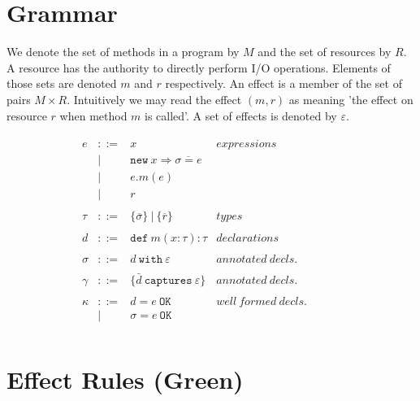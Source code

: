 \documentclass{article}
\newcommand{\keywadj}[1]{\mathtt{#1}}
\newcommand{\keyw}[1]{\keywadj{#1}~}
\begin{document}
\section{Grammar}

We denote the set of methods in a program by $M$ and the set of resources by $R$. A resource has the authority to directly perform I/O operations. Elements of those sets are denoted $m$ and $r$ respectively. An effect is a member of the set of pairs $M \times R$. Intuitively we may read the effect $(m,r)$ as meaning 'the effect on resource $r$ when method $m$ is called'. A set of effects is denoted by $\varepsilon$.

\[
\begin{array}{lll}

\begin{array}{lllr}
e & ::= & x & expressions \\
  & | & \keywadj{new}~x \Rightarrow \overline{\sigma = e} \\
  & | & e.m(e)\\
  & | & r \\
&&\\

\tau & ::= & \{ \overline{\sigma} \} ~ | ~ \{ \overline r \} & types \\

\\d & ::= & \keyw{def} m(x:\tau):\tau & declarations\\
&&\\

\sigma & ::= & d~\keyw{with}\varepsilon  & annotated~ decls.\\
&&\\

\gamma & ::= & \{ \bar d~\keyw{captures} \varepsilon \} & annotated~decls.\\
&&\\

\kappa & ::= & d = e~\keyw{OK} & well~formed~decls. \\
  & | & \sigma = e~\keyw{OK}\\
\end{array}
& ~~~~~~
&
\end{array}
\]

\section{Effect Rules (Green)}
\end{document}
